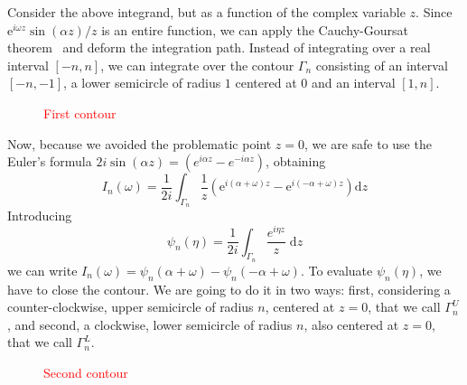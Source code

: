Consider the above integrand, but as a function of the complex variable \(z\). Since \(\mathrm{e}^{i \omega  z}  \sin (\alpha z)/z\)
is an entire function, we can apply the Cauchy-Goursat theorem~\autocite{Byron1992} and deform the integration path.
Instead of integrating over a real interval \([-n,n]\), we can integrate over the contour \(\Gamma_n\) consisting of
an interval \([-n,-1]\), a lower semicircle of radius \(1\) centered at \(0\) and an interval \([1,n]\).
\begin{figure}
    \centering
    \textcolor{red}{First contour}
    \label{fig:contour_gamma_n}
\end{figure}
Now, because we avoided the problematic point \(z=0\), we are safe to use the Euler's formula
\(2i\sin (\alpha z) = \left( e^{i \alpha z} - e^{-i \alpha  z} \right) \), obtaining
\begin{equation}
    I_n(\omega ) = \frac{1}{2i} \int_{\Gamma_n} \frac{1}{z} \left( \mathrm{e}^{i (\alpha + \omega )z}- \mathrm{e}^{i(-\alpha + \omega )z}  \right)  \mathrm{d}z
\end{equation} 
Introducing 
\begin{equation}
    \psi_n(\eta ) = \frac{1}{2i} \int_{\Gamma_n} \frac{e^{i \eta z}}{z}\; \mathrm{d}z
\end{equation}
we can write \(I_n(\omega ) = \psi _n(\alpha +\omega ) - \psi _n (-\alpha + \omega )\). To evaluate \(\psi _n(\eta )\),
we have to close the contour. We are going to do it in two ways: first, considering a counter-clockwise, upper semicircle
of radius \(n\), centered at \(z=0\), that we call \(\Gamma_n^U\), and second, a clockwise, lower semicircle of radius \(n\),
also centered at \(z=0\), that we call \(\Gamma_n^L\).

\begin{figure}[htbp]
    \centering
    \textcolor{red}{Second contour}    
    \label{<label>}
\end{figure}

